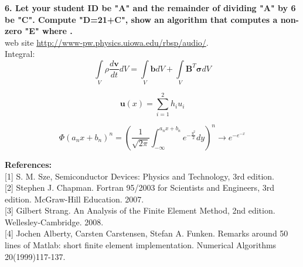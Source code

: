 \documentclass[10pt]{article} %
\begin{document}
\textbf{6. Let your student ID be "A" and the remainder of dividing "A" by 6 be "C". Compute "D=21+C", show an algorithm that computes a non-zero "E" where .}\\[10pt]
web site \href{http://www-pw.physics.uiowa.edu/rbsp/audio/}{http://www-pw.physics.uiowa.edu/rbsp/audio/}.\\[10pt]
Integral:\\
$$
\int\limits_{V}\rho\frac{d\mathbf{v}}{dt}dV = \int\limits_{V}\mathbf{b}dV + \int\limits_{V}\mathbf{B}^T\mathbf{\sigma}dV
$$

$$
\mathbf{u}(x)=\sum\limits_{i=1}^{2} h_i u_i
$$

$$
\Phi(a_nx+b_n)^n = (\frac{1}{\sqrt{2\pi}}\int_{-\infty}^{a_nx+b_n} e^{-\frac{y^2}{2}}dy)^n \rightarrow e^{-e^{-x}}
$$

\vspace{1cm}

\textbf{References:}\\[5pt]
[1] S. M. Sze, Semiconductor Devices: Physics and Technology, 3rd edition.\\

[2] Stephen J. Chapman. Fortran 95/2003 for Scientists and Engineers, 3rd edition. McGraw-Hill Education. 2007.\\

[3] Gilbert Strang. An Analysis of the Finite Element Method, 2nd edition. Wellesley-Cambridge. 2008.\\

[4] Jochen Alberty, Carsten Carstensen, Stefan A. Funken. Remarks around 50 lines of Matlab: short finite element implementation. Numerical Algorithms 20(1999)117-137.
\end{document}
